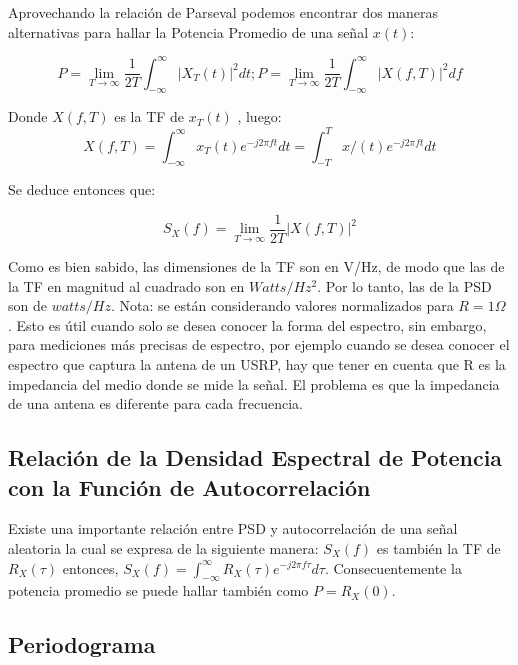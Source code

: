 Aprovechando la relación de Parseval podemos encontrar dos maneras alternativas para hallar la Potencia Promedio de una señal $x(t)$:

\begin{equation} \label{equ_treintauno}
	 P = \lim_{T \to \infty} \dfrac{1}{2T} \int_{-\infty}^{\infty} |X_{T}(t)|^{2}dt  ;  P = \lim_{T \to \infty} \dfrac{1}{2T} \int_{-\infty}^{\infty} |X(f , T)|^{2}df 
\end{equation}

Donde $X(f,T)$ es la TF de $x_{T}(t)$ , luego: \\

\begin{equation} \label{equ_treintados}
X(f,T) = \int_{-\infty}^{\infty} x_{T}(t)e^{-j2\pi ft} dt = \int_{-T}^{T} x/(t)e^{-j2\pi ft} dt 
\end{equation}

Se deduce entonces que:

\begin{equation} \label{equ_treintatres}
	 S_{X}(f) = \lim_{T \to \infty} \frac{1}{2T} |X(f, T)|^{2} 
\end{equation}

Como es bien sabido, las dimensiones de la TF son en V/Hz, de modo que las de la TF en magnitud al cuadrado son en $Watts/Hz^{2}$. Por lo tanto, las de la PSD son de $watts/Hz$. Nota: se están considerando valores normalizados para $R = 1\Omega$ . Esto es útil cuando solo se desea conocer la forma del espectro, sin embargo, para mediciones más precisas de espectro, por ejemplo cuando se desea conocer el espectro que captura la antena de un USRP, hay que tener en cuenta que R es la impedancia del medio donde se mide la señal. El problema es que la impedancia de una antena es diferente para cada frecuencia.\\
\subsection{Relación de la Densidad Espectral de Potencia con la Función de Autocorrelación}
Existe una importante relación entre PSD y autocorrelación de una señal aleatoria la cual se expresa de la siguiente manera:
$S_{X}(f)$ es también la TF de $R_{X}(\tau)$ entonces, $S_{X}(f)=\int_{-\infty}^{\infty} R_{X}(\tau)e^{-j2\pi f\tau} d\tau$. Consecuentemente la potencia promedio se puede hallar también como $P=R_{X}(0)$.\\

\subsection{Periodograma}

